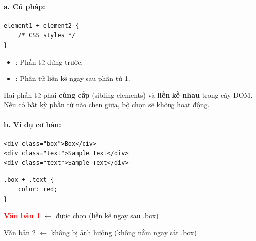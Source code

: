 \paragraph{a. Cú pháp:}
\begin{codeWindow}
\begin{lstlisting}[language=CSS3]
element1 + element2 {
    /* CSS styles */
}
\end{lstlisting}
\end{codeWindow}

\begin{itemize}[leftmargin=1.5em, itemsep=2pt, parsep=0pt]
    \item {}: Phần tử đứng trước.
    \item {}: Phần tử liền kề ngay sau phần tử 1.
\end{itemize}

\begin{noteBox}
Hai phần tử phải \textbf{cùng cấp} (sibling elements) và \textbf{liền kề nhau} trong cây DOM. Nếu có bất kỳ phần tử nào chen giữa, bộ chọn sẽ không hoạt động.
\end{noteBox}

\paragraph{b. Ví dụ cơ bản:}
\begin{codeWindow}
\begin{lstlisting}[language=HTML5]
<div class="box">Box</div>
<div class="text">Sample Text</div>
<div class="text">Sample Text</div>
\end{lstlisting}

\begin{lstlisting}[language=CSS3]
.box + .text {
    color: red;
}
\end{lstlisting}
\end{codeWindow}

\begin{browserWindow}
\sffamily\small
{} \par\vspace{4pt}
\textcolor{red}{\textbf{Văn bản 1}} {\small\textcolor{gray!60}{$\leftarrow$ được chọn (liền kề ngay sau .box)}} \par\vspace{2pt}
\textcolor{darkText}{Văn bản 2} {\small\textcolor{gray!60}{$\leftarrow$ không bị ảnh hưởng (không nằm ngay sát .box)}} \par\vspace{4pt}
\end{browserWindow}

